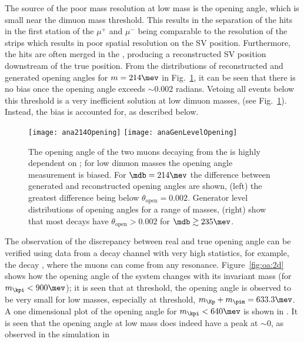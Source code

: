 The source of the poor mass resolution at low mass is the \mumu opening angle, which is small near
the dimuon mass threshold.
This results in the separation of the hits in the first \velo station of the $\mu^+$ and $\mu^-$
being comparable to the resolution of the \velo strips which results in poor spatial resolution on
the SV position.
Furthermore, the hits are often merged in the \velo, producing a reconstructed SV position
downstream of the true position.
From the distributions of reconstructed and generated opening angles for $m=214\mev$ in
Fig.~\ref{fig:opening:gen},
it can be seen that there is no bias once the \mumu opening angle exceeds $\sim0.002$ radians.
Vetoing all events below this threshold is a very inefficient solution at low dimuon
masses, (see Fig.~\ref{fig:opening:gen}).
Instead, the bias is accounted for, as described below.

\begin{figure}
  \begin{center}
    \texttt{[image: ana214Opening]}
    \texttt{[image: anaGenLevelOpening]}
  \end{center}
  \caption{\small
    The opening angle of the two muons decaying from the \db is highly dependent on \mdb; for low
    dimuon masses the opening angle measurement is biased.
    For $\mdb=214\mev$ the difference between generated and reconstructed opening angles are shown,
    (left) the greatest difference being below $\theta_\mathrm{open}=0.002$.
    Generator level distributions of opening angles for a range of masses,
    (right) show that most \db decays have $\theta_\mathrm{open}>0.002$ for
    $\mdb\gtrsim235\mev$.
  }
  \label{fig:opening:gen}
\end{figure}

The observation of the discrepancy between real and true opening angle can be verified using data
from a decay channel with very high statistics, for example,
the decay \decay{\Bd}{\kpi\mumu}, where the muons can come from any resonance.
Figure~\ref{fig:oa:2d} shows how the opening angle of the \kpi system changes with its invariant
mass (for $m_{\kpi}<900\mev$); it is seen that at threshold, the opening angle is observed to be
very small for low masses, especially at threshold, $m_{\Kp} + m_{\pim} = 633.3\mev$.
A one dimensional plot of the opening angle for $m_{\kpi}<640\mev$ is shown in .
It is seen that the \kpi opening angle at low mass does indeed have a peak at $\sim\!0$, as
observed in the simulation in 

